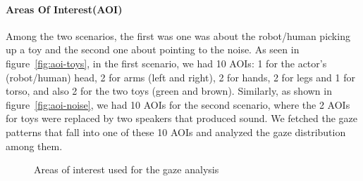 \documentclass[a4,twocolumn,10pt]{article}
\begin{document}
\paragraph{Areas Of Interest(AOI)}

Among the two scenarios, the first was one was about the robot/human picking up
a toy and the second one about pointing to the noise. As seen in
figure~\ref{fig:aoi-toys}, in
the first scenario, we had 10 AOIs: 1 for the actor's (robot/human) head, 2 for
arms (left and right), 2 for hands, 2 for legs and 1 for torso, and also 2 for
the two toys (green and brown). Similarly, as shown in
figure~\ref{fig:aoi-noise}, we had 10
AOIs for the second scenario, where the 2 AOIs for toys were replaced by two
speakers that produced sound. We fetched the gaze patterns that fall into one of
these 10 AOIs and analyzed the gaze distribution among them.

\begin{figure}
    \centering


    \caption{Areas of interest used for the gaze analysis}
    \label{fig:aoi}
\end{figure}
\end{document}
